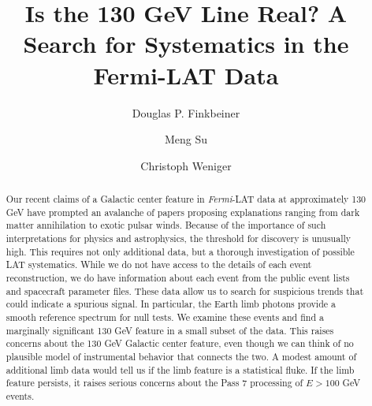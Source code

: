 \documentclass[aps,twocolumn,prd,superscriptaddress,showpacs,nofootinbib,fixfloat]{revtex4}
\newcommand{\Fermi}{{\slshape Fermi}}
\begin{document}
\title{Is the 130 GeV Line Real? 
  A Search for Systematics in the Fermi-LAT Data}

\author{Douglas P. Finkbeiner}

\author{Meng Su}

\author{Christoph Weniger}

\begin{abstract} Our recent claims of a Galactic center
  feature in \Fermi-LAT data at approximately 130 GeV have
  prompted an avalanche of papers proposing explanations
  ranging from dark matter annihilation to exotic pulsar
  winds.  Because of the importance of such interpretations
  for physics and astrophysics, the threshold for discovery
  is unusually high.  This requires not only additional
  data, but a thorough investigation of possible LAT
  systematics.  While we do not have access to the details
  of each event reconstruction, we do have information about
  each event from the public event lists and spacecraft
  parameter files.  These data allow us to search for
  suspicious trends that could indicate a spurious signal.
  In particular, the Earth limb photons provide a smooth
  reference spectrum for null tests.  We examine these
  events and find a marginally significant 130 GeV feature
  in a small subset of the data.  This raises concerns about
  the 130 GeV Galactic center feature, even though we can
  think of no plausible model of instrumental behavior that
  connects the two.  A modest amount of additional limb data
  would tell us if the limb feature is a statistical fluke.
  If the limb feature persists, it raises serious concerns
  about the Pass 7 processing of $E > 100$ GeV events.
\end{abstract}

\pacs{}

\maketitle
\end{document}
